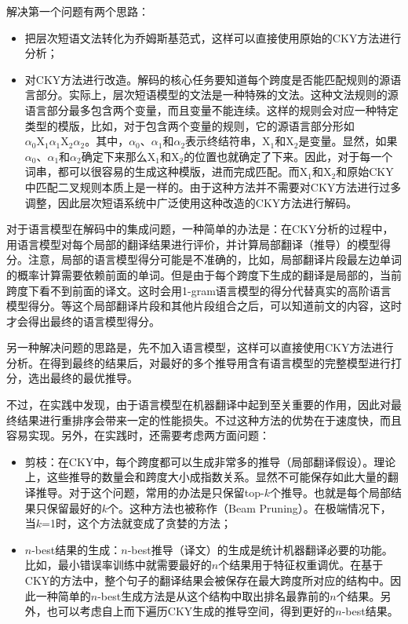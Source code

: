 \parinterval 解决第一个问题有两个思路：

\begin{itemize}
\vspace{0.5em}
\item 把层次短语文法转化为乔姆斯基范式，这样可以直接使用原始的CKY方法进行分析；
\vspace{0.5em}
\item 对CKY方法进行改造。解码的核心任务要知道每个跨度是否能匹配规则的源语言部分。实际上，层次短语模型的文法是一种特殊的文法。这种文法规则的源语言部分最多包含两个变量，而且变量不能连续。这样的规则会对应一种特定类型的模版，比如，对于包含两个变量的规则，它的源语言部分形如$\alpha_0 \textrm{X}_1 \alpha_1 \textrm{X}_2 \alpha_2$。其中，$\alpha_0$、$\alpha_1$和$\alpha_2$表示终结符串，$\textrm{X}_1$和$\textrm{X}_2$是变量。显然，如果$\alpha_0$、$\alpha_1$和$\alpha_2$确定下来那么$\textrm{X}_1$和$\textrm{X}_2$的位置也就确定了下来。因此，对于每一个词串，都可以很容易的生成这种模版，进而完成匹配。而$\textrm{X}_1$和$\textrm{X}_2$和原始CKY中匹配二叉规则本质上是一样的。由于这种方法并不需要对CKY方法进行过多调整，因此层次短语系统中广泛使用这种改造的CKY方法进行解码。
\vspace{0.5em}
\end{itemize}

\parinterval 对于语言模型在解码中的集成问题，一种简单的办法是：在CKY分析的过程中，用语言模型对每个局部的翻译结果进行评价，并计算局部翻译（推导）的模型得分。注意，局部的语言模型得分可能是不准确的，比如，局部翻译片段最左边单词的概率计算需要依赖前面的单词。但是由于每个跨度下生成的翻译是局部的，当前跨度下看不到前面的译文。这时会用1-gram语言模型的得分代替真实的高阶语言模型得分。等这个局部翻译片段和其他片段组合之后，可以知道前文的内容，这时才会得出最终的语言模型得分。

\parinterval 另一种解决问题的思路是，先不加入语言模型，这样可以直接使用CKY方法进行分析。在得到最终的结果后，对最好的多个推导用含有语言模型的完整模型进行打分，选出最终的最优推导。

\parinterval 不过，在实践中发现，由于语言模型在机器翻译中起到至关重要的作用，因此对最终结果进行重排序会带来一定的性能损失。不过这种方法的优势在于速度快，而且容易实现。另外，在实践时，还需要考虑两方面问题：

\begin{itemize}
\vspace{0.5em}
\item 剪枝：在CKY中，每个跨度都可以生成非常多的推导（局部翻译假设）。理论上，这些推导的数量会和跨度大小成指数关系。显然不可能保存如此大量的翻译推导。对于这个问题，常用的办法是只保留top-$k$个推导。也就是每个局部结果只保留最好的$k$个。这种方法也被称作{\small{}}（Beam Pruning）。在极端情况下，当$k$=1时，这个方法就变成了贪婪的方法；
\vspace{0.5em}
\item $n$-best结果的生成：$n$-best推导（译文）的生成是统计机器翻译必要的功能。比如，最小错误率训练中就需要最好的$n$个结果用于特征权重调优。在基于CKY的方法中，整个句子的翻译结果会被保存在最大跨度所对应的结构中。因此一种简单的$n$-best生成方法是从这个结构中取出排名最靠前的$n$个结果。另外，也可以考虑自上而下遍历CKY生成的推导空间，得到更好的$n$-best结果\cite{huang2005better}。
\end{itemize}

